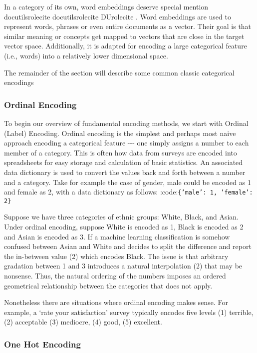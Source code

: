 \documentclass[]{article}
\providecommand*{\DUrole}[2]{%
  \ifcsname docutilsrole#1\endcsname%
    \csname docutilsrole#1\endcsname{#2}%
  \else
    \csname DUrole#1\endcsname{#2}%
  \fi%
}
\begin{document}
In a category of its own, word embeddings deserve special mention
\DUrole{cite}{wiki:wordembeddings}. Word embeddings
are used to represent words, phrases or even entire documents as a
vector. Their goal is that similar meaning or concepts get mapped to
vectors that are close in the target vector space. Additionally, it is
adapted for encoding a large categorical feature (i.e., words) into a
relatively lower dimensional space.

The remainder of the section will describe some common classic
categorical encodings

\subsubsection{Ordinal Encoding%
  \label{ordinal-encoding}%
}


To begin our overview of fundamental encoding methods, we start with
Ordinal (Label) Encoding. Ordinal encoding is the simplest and perhaps
most naive approach encoding a categorical feature -{}-{}- one simply
assigns a number to each member of a category. This is often how data
from surveys are encoded into spreadsheets for easy storage and
calculation of basic statistics. An associated data dictionary is used
to convert the values back and forth between a number and a category.
Take for example the case of gender, male could be encoded as 1 and
female as 2, with a data dictionary as follows:
:code:\texttt{\{'male': 1, 'female': 2\}}

Suppose we have three categories of ethnic groups: White, Black, and
Asian. Under ordinal encoding, suppose White is encoded as 1, Black is
encoded as 2 and Asian is encoded as 3. If a machine learning
classification is somehow confused between Asian and White and decides
to split the difference and report the in-between value (2) which
encodes Black. The issue is that arbitrary gradation between 1 and 3
introduces a natural interpolation (2) that may be nonsense. Thus, the
natural ordering of the numbers imposes an ordered geometrical
relationship between the categories that does not apply.

Nonetheless there are situations where ordinal encoding makes sense. For
example, a `rate your satisfaction' survey typically encodes five levels
(1) terrible, (2) acceptable (3) mediocre, (4) good, (5) excellent.

\subsubsection{One Hot Encoding%
  \label{one-hot-encoding}%
}
\end{document}
